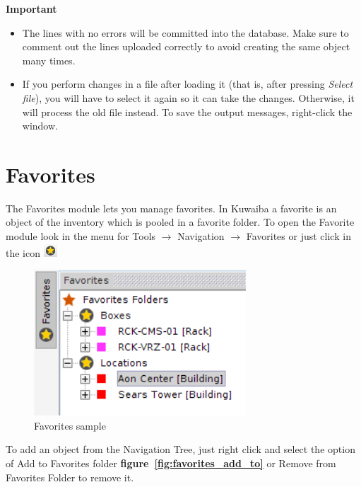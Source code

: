 \documentclass[a4paper]{article}
\begin{document}
				\newpage
				\begin{framed} {\large \textbf{Important}}
					\begin{itemize}
					\item The lines with no errors will be committed into the database. Make sure to comment out the lines uploaded correctly to avoid creating the same object many times.
					
					\item If you perform changes in a file after loading it (that is, after pressing \textit{Select file}), you will have to select it again so it can take the changes. Otherwise, it will process the old file instead. To save the output messages, right-click the window.
					\end{itemize}
				\end{framed}
		
		\clearpage
		\section{Favorites}\label{sec:favorites}
		
			The Favorites module lets you manage favorites. In Kuwaiba a favorite is an object of the inventory which is pooled in a favorite folder. To open the Favorite module look in the menu for Tools $\rightarrow$ Navigation $\rightarrow$ Favorites or just click in the icon
			\includegraphics[width=0.5cm]{img/icon_bookmarks.png}
			
			\begin{figure}[h!]
				\centering
				\includegraphics[width=0.5\linewidth]{img/favorites_explorer.png}
				\caption{Favorites sample}
				\label{fig:bookmakrs}
			\end{figure}
			
			To add an object from the Navigation Tree, just right click and select the option of Add to Favorites folder \textbf{figure~\ref{fig:favorites_add_to}} or Remove from Favorites Folder to remove it.
						
\end{document}
